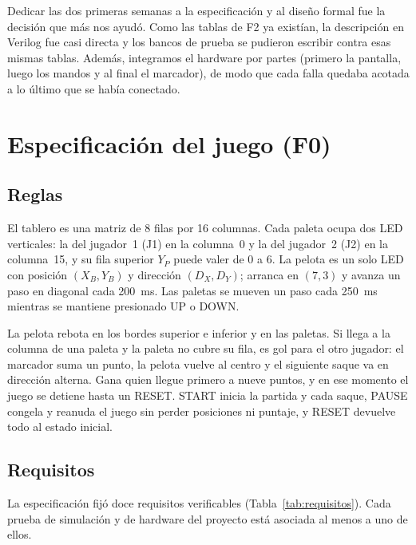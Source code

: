\documentclass[conference,a4paper]{IEEEtran}
\begin{document}
Dedicar las dos primeras semanas a la especificación y al diseño formal fue la decisión que más nos ayudó. Como las tablas de F2 ya existían, la descripción en Verilog fue casi directa y los bancos de prueba se pudieron escribir contra esas mismas tablas. Además, integramos el hardware por partes (primero la pantalla, luego los mandos y al final el marcador), de modo que cada falla quedaba acotada a lo último que se había conectado.

\section{Especificación del juego (F0)}
\label{sec:especificacion}

\subsection{Reglas}

El tablero es una matriz de 8 filas por 16 columnas. Cada paleta ocupa dos LED verticales: la del jugador~1 (J1) en la columna~0 y la del jugador~2 (J2) en la columna~15, y su fila superior $Y_P$ puede valer de 0 a 6. La pelota es un solo LED con posición $(X_B,Y_B)$ y dirección $(D_X,D_Y)$; arranca en $(7,3)$ y avanza un paso en diagonal cada 200~ms. Las paletas se mueven un paso cada 250~ms mientras se mantiene presionado UP o DOWN.

La pelota rebota en los bordes superior e inferior y en las paletas. Si llega a la columna de una paleta y la paleta no cubre su fila, es gol para el otro jugador: el marcador suma un punto, la pelota vuelve al centro y el siguiente saque va en dirección alterna. Gana quien llegue primero a nueve puntos, y en ese momento el juego se detiene hasta un RESET. START inicia la partida y cada saque, PAUSE congela y reanuda el juego sin perder posiciones ni puntaje, y RESET devuelve todo al estado inicial.

\subsection{Requisitos}

La especificación fijó doce requisitos verificables (Tabla~\ref{tab:requisitos}). Cada prueba de simulación y de hardware del proyecto está asociada al menos a uno de ellos.
\end{document}

